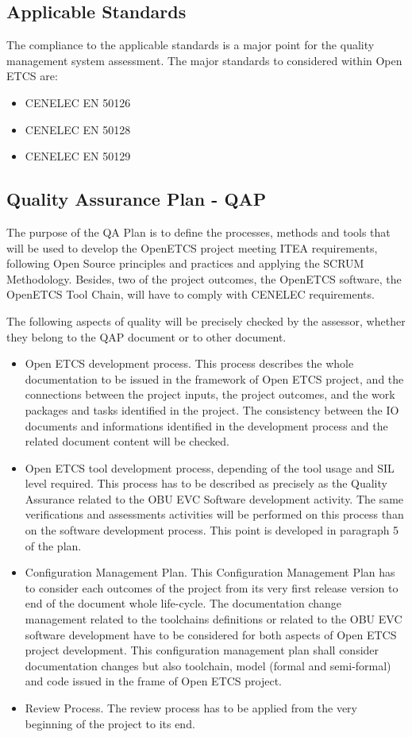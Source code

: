 \documentclass{template/openetcs_article}
\begin{document}
\subsection{Applicable Standards}
The compliance to the applicable standards is a major point for the quality management system assessment.
The major standards to considered within Open ETCS are:
\begin{itemize}
\item CENELEC EN 50126
\item CENELEC EN 50128
\item CENELEC EN 50129
\end{itemize}


\subsection{Quality Assurance Plan - QAP}
The purpose of the QA Plan is to define the processes, methods and tools that will be used to develop the OpenETCS project meeting ITEA requirements, following Open Source principles and practices and applying the SCRUM Methodology. Besides, two of the project outcomes, the OpenETCS software, the OpenETCS Tool Chain, will have to comply with CENELEC requirements.

The following aspects of quality will be precisely checked by the assessor, whether they belong to the QAP document or to other document.
\begin{itemize}
\item  Open ETCS development process. This process describes the whole documentation to be issued in the framework of Open ETCS project, and the connections between the project inputs, the project outcomes, and the work packages and tasks identified in the project. The consistency between the IO documents and informations identified in the development process and the related document content will be checked.
\item  Open ETCS tool development process, depending of the tool usage and SIL level required. This process has to be described as precisely as the Quality Assurance related to the OBU EVC Software development activity. The same verifications and assessments activities will be performed on this process than on the software development process. This point is developed in paragraph 5 of the plan.
\item Configuration Management Plan. This Configuration Management Plan has to consider each outcomes of the project from its very first release version to end of the document whole life-cycle. The documentation change management related to the toolchains definitions or related to the OBU EVC software development have to be considered for both aspects of Open ETCS project development. This configuration management plan shall consider documentation changes but also toolchain, model (formal and semi-formal) and code issued in the frame of Open ETCS project.
\item Review Process. The review process has to be applied from the very beginning of the project to its end.
\end{itemize}
\end{document}
